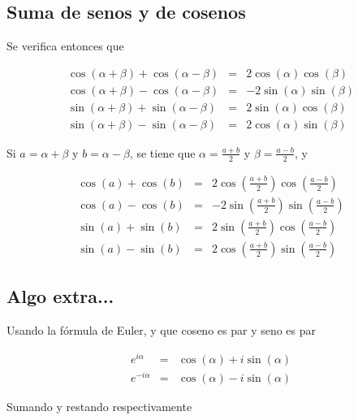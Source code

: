 \subsection{Suma de senos y de cosenos}

Se verifica entonces que

\begin{eqnarray*}
\cos(\alpha + \beta) + \cos(\alpha - \beta) &=& 2 \cos(\alpha)\cos(\beta) \\
\cos(\alpha + \beta) - \cos(\alpha - \beta) &=& -2 \sin(\alpha) \sin(\beta) \\
\sin(\alpha + \beta) + \sin(\alpha - \beta) &=& 2 \sin(\alpha) \cos(\beta) \\
\sin(\alpha + \beta) - \sin(\alpha - \beta) &=& 2 \cos(\alpha) \sin(\beta) 
\end{eqnarray*}

Si $a = \alpha + \beta$ y $b = \alpha - \beta$, se tiene que $\alpha = \frac{a+b}{2}$ y $\beta = \frac{a-b}{2}$, y 


\begin{eqnarray*}
\cos(a) + \cos(b) &=& 2 \cos(\frac{a+b}{2})\cos(\frac{a-b}{2}) \\
\cos(a) - \cos(b) &=& -2 \sin(\frac{a+b}{2})\sin(\frac{a-b}{2}) \\
\sin(a) + \sin(b) &=& 2 \sin(\frac{a+b}{2}) \cos(\frac{a-b}{2}) \\
\sin(a) - \sin(b) &=& 2 \cos(\frac{a+b}{2}) \sin(\frac{a-b}{2}) 
\end{eqnarray*}

\subsection{Algo extra...}

Usando la fórmula de Euler, y que coseno es par y seno es par

\begin{eqnarray*}
e^{i \alpha} &=& \cos(\alpha) + i \sin(\alpha) \\
e^{- i \alpha} &=& \cos(\alpha) - i \sin(\alpha)
\end{eqnarray*}

Sumando y restando respectivamente

